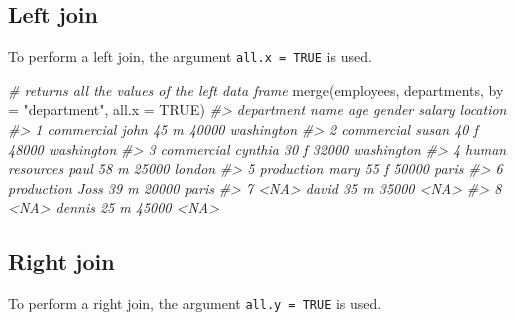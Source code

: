\documentclass[
]{book}
\newenvironment{Shaded}{\begin{snugshade}}{\end{snugshade}}
\newcommand{\AttributeTok}[1]{\textcolor[rgb]{0.77,0.63,0.00}{#1}}
\newcommand{\CommentTok}[1]{\textcolor[rgb]{0.56,0.35,0.01}{\textit{#1}}}
\newcommand{\ConstantTok}[1]{\textcolor[rgb]{0.00,0.00,0.00}{#1}}
\newcommand{\FunctionTok}[1]{\textcolor[rgb]{0.00,0.00,0.00}{#1}}
\newcommand{\NormalTok}[1]{#1}
\newcommand{\StringTok}[1]{\textcolor[rgb]{0.31,0.60,0.02}{#1}}
\begin{document}
\hypertarget{left-join}{%
\subsection{Left join}\label{left-join}}

To perform a left join, the argument \texttt{all.x\ =\ TRUE} is used.

\begin{Shaded}
\begin{Highlighting}[]
\CommentTok{\# returns all the values of the left data frame}
\FunctionTok{merge}\NormalTok{(employees, departments, }\AttributeTok{by =} \StringTok{"department"}\NormalTok{, }\AttributeTok{all.x =} \ConstantTok{TRUE}\NormalTok{)}
\CommentTok{\#\textgreater{}        department    name age gender salary   location}
\CommentTok{\#\textgreater{} 1      commercial    john  45      m  40000 washington}
\CommentTok{\#\textgreater{} 2      commercial   susan  40      f  48000 washington}
\CommentTok{\#\textgreater{} 3      commercial cynthia  30      f  32000 washington}
\CommentTok{\#\textgreater{} 4 human resources    paul  58      m  25000     london}
\CommentTok{\#\textgreater{} 5      production    mary  55      f  50000      paris}
\CommentTok{\#\textgreater{} 6      production    Joss  39      m  20000      paris}
\CommentTok{\#\textgreater{} 7            \textless{}NA\textgreater{}   david  35      m  35000       \textless{}NA\textgreater{}}
\CommentTok{\#\textgreater{} 8            \textless{}NA\textgreater{}  dennis  25      m  45000       \textless{}NA\textgreater{}}
\end{Highlighting}
\end{Shaded}

\hypertarget{right-join}{%
\subsection{Right join}\label{right-join}}

To perform a right join, the argument \texttt{all.y\ =\ TRUE} is used.
\end{document}
